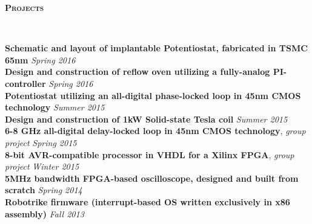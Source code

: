 \documentclass{article}
\newenvironment{changemargin}[2]{%
  \begin{list}{}{%
    \setlength{\topsep}{0pt}%
    \setlength{\leftmargin}{#1}%
    \setlength{\rightmargin}{#2}%
    \setlength{\listparindent}{\parindent}%
    \setlength{\itemindent}{\parindent}%
    \setlength{\parsep}{\parskip}%
  }%
  \item[]}{\end{list}
}
\newcommand{\lineover}{
	\begin{changemargin}{-0.05in}{-0.05in}
		\vspace*{-8pt}
		\hrulefill \\
		\vspace*{-2pt}
	\end{changemargin}
}
\newcommand{\header}[1]{
	\begin{changemargin}{-.5in}{-0.5in}
		{\large \textbf{\scshape{#1}}}\\
  	\lineover
	\end{changemargin}
}
\newenvironment{body} {
	\vspace*{-16pt}
	\begin{changemargin}{-0.25in}{-0.5in}
  }	
	{\end{changemargin}
}
\newcommand{\CC}{C\nolinebreak\hspace{-.05em}\raisebox{.4ex}{\tiny\bf +}\nolinebreak\hspace{-.10em}\raisebox{.4ex}{\tiny\bf +}}
\begin{document}
\begin{body}

\end{body}

\smallskip

\iffalse
\header{Projects}
\begin{body}
	\vspace{14pt}
	\textbf{Schematic and layout of implantable Potentiostat, fabricated in TSMC 65nm} \hfill \emph{Spring 2016}\\
	\textbf{Design and construction of reflow oven utilizing a fully-analog PI-controller} \hfill \emph{Spring 2016}\\
	\textbf{Potentiostat utilizing an all-digital phase-locked loop in 45nm CMOS technology} \hfill \emph{Summer 2015}\\
	\textbf{Design and construction of 1kW Solid-state Tesla coil} \hfill \emph{Summer 2015} \\
	\textbf{6-8 GHz all-digital delay-locked loop in 45nm CMOS technology}, \emph{group project} \hfill \emph{Spring 2015}\\
	\textbf{8-bit AVR-compatible processor in VHDL for a Xilinx FPGA}, \emph{group project} \hfill \emph{Winter 2015}\\
	\textbf{5MHz bandwidth FPGA-based oscilloscope, designed and built from scratch} \hfill \emph{Spring 2014}\\
	\textbf{Robotrike firmware (interrupt-based OS written exclusively in x86 assembly)} \hfill \emph{Fall 2013}\\
\end{body}
\end{document}
